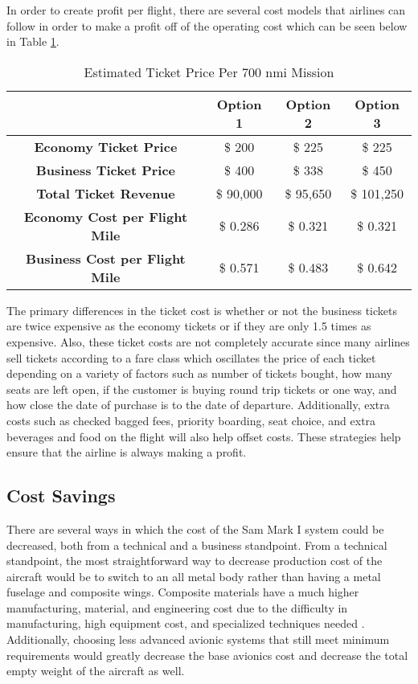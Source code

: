 In order to create profit per flight, there are several cost models that airlines can follow in order to make a profit off of the operating cost which can be seen below in Table \ref{tab:tickets}.

\begin{table}[!h]
    \centering
        \caption{Estimated Ticket Price Per 700 nmi Mission}
    \begin{tabular}{|c||c|c|c|}\toprule
         & \textbf{Option 1} & \textbf{Option 2} & \textbf{Option 3} \\\hline \hline
         \textbf{Economy Ticket Price} & \$ 200 & \$ 225 & \$ 225 \\ \hline
         \textbf{Business Ticket Price} & \$ 400 & \$ 338 & \$ 450  \\ \hline
         \textbf{Total Ticket Revenue} & \$ 90,000 & \$ 95,650 & \$ 101,250 \\ \hline
         \textbf{Economy Cost per Flight Mile} &  \$ 0.286 &  \$ 0.321 &  \$ 0.321 \\ \hline
         \textbf{Business Cost per Flight Mile} &  \$ 0.571 &  \$ 0.483 &  \$ 0.642 \\\bottomrule
    \end{tabular}
    \label{tab:tickets}
\end{table}

The primary differences in the ticket cost is whether or not the business tickets are twice expensive as the economy tickets or if they are only 1.5 times as expensive. Also, these ticket costs are not completely accurate since many airlines sell tickets according to a fare class which oscillates the price of each ticket depending on a variety of factors such as number of tickets bought, how many seats are left open, if the customer is buying round trip tickets or one way, and how close the date of purchase is to the date of departure. Additionally, extra costs such as checked bagged fees, priority boarding, seat choice, and extra beverages and food on the flight will also help offset costs. These strategies help ensure that the airline is always making a profit.

\subsection{Cost Savings}

There are several ways in which the cost of the Sam Mark I system could be decreased, both from a technical and a business standpoint. From a technical standpoint, the most straightforward way to decrease production cost of the aircraft would be to switch to an all metal body rather than having a metal fuselage and composite wings. Composite materials have a much higher manufacturing, material, and engineering cost due to the difficulty in manufacturing, high equipment cost, and specialized techniques needed \cite{compositecost}. Additionally, choosing less advanced avionic systems that still meet minimum requirements would greatly decrease the base avionics cost and decrease the total empty weight of the aircraft as well.

